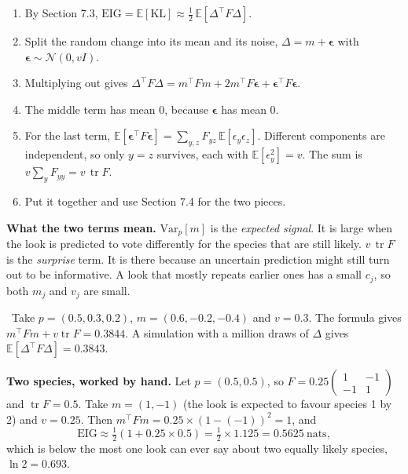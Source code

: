 \documentclass[11pt]{article}
\newcommand{\EIG}{\mathrm{EIG}}
\newcommand{\KL}{\mathrm{KL}}
\newcommand{\Var}{\mathrm{Var}}
\newcommand{\tr}{\operatorname{tr}}
\newcommand{\Steps}{\par\smallskip\noindent{\sffamily\bfseries\color{headblue}Steps.}\par}
\newcommand{\CheckNum}{\par\smallskip\noindent{\sffamily\bfseries\color{headblue}Check with numbers.}\ }
\newenvironment{steps}{\begin{enumerate}[label=\textbf{\arabic*.},leftmargin=2em,itemsep=6pt]}{\end{enumerate}}
\begin{document}
\Steps
\begin{steps}
  \item By Section 7.3, $\EIG=\mathbb E[\KL]\approx\tfrac12\,\mathbb E[\Delta^\top F\Delta]$.
  \item Split the random change into its mean and its noise, $\Delta=m+\bm\epsilon$ with $\bm\epsilon\sim\mathcal N(0,vI)$.
  \item Multiplying out gives $\Delta^\top F\Delta=m^\top Fm+2m^\top F\bm\epsilon+\bm\epsilon^\top F\bm\epsilon$.
  \item The middle term has mean 0, because $\bm\epsilon$ has mean 0.
  \item For the last term, $\mathbb E[\bm\epsilon^\top F\bm\epsilon]=\sum_{y,z}F_{yz}\,\mathbb E[\epsilon_y\epsilon_z]$. Different components are independent, so only $y=z$ survives, each with $\mathbb E[\epsilon_y^2]=v$. The sum is $v\sum_yF_{yy}=v\,\tr F$.
  \item Put it together and use Section 7.4 for the two pieces.
\end{steps}

\textbf{What the two terms mean.} $\Var_p[m]$ is the \emph{expected signal}. It is large when the look is predicted to vote differently for the species that are still likely. $v\,\tr F$ is the \emph{surprise} term. It is there because an uncertain prediction might still turn out to be informative. A look that mostly repeats earlier ones has a small $c_j$, so both $m_j$ and $v_j$ are small.

\CheckNum Take $p=(0.5,0.3,0.2)$, $m=(0.6,-0.2,-0.4)$ and $v=0.3$. The formula gives $m^\top Fm+v\tr F=0.3844$. A simulation with a million draws of $\Delta$ gives $\mathbb E[\Delta^\top F\Delta]=0.3843$.

\textbf{Two species, worked by hand.} Let $p=(0.5,0.5)$, so $F=0.25\begin{pmatrix}1&-1\\-1&1\end{pmatrix}$ and $\tr F=0.5$. Take $m=(1,-1)$ (the look is expected to favour species 1 by 2) and $v=0.25$. Then $m^\top Fm=0.25\times(1-(-1))^2=1$, and
\[ \EIG\approx\tfrac12(1+0.25\times0.5)=\tfrac12\times1.125=0.5625\ \text{nats}, \]
which is below the most one look can ever say about two equally likely species, $\ln2=0.693$.
\end{document}
